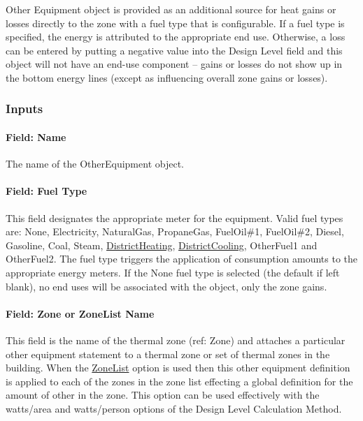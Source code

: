 Other Equipment object is provided as an additional source for heat gains or losses directly to the zone with a fuel type that is configurable. If a fuel type is specified, the energy is attributed to the appropriate end use. Otherwise, a loss can be entered by putting a negative value into the Design Level field and this object will not have an end-use component -- gains or losses do not show up in the bottom energy lines (except as influencing overall zone gains or losses).

\subsubsection{Inputs}\label{inputs-8-010}

\paragraph{Field: Name}\label{field-name-8-008}

The name of the OtherEquipment object.

\paragraph{Field: Fuel Type}\label{field-fuel-use-type}

This field designates the appropriate meter for the equipment. Valid fuel types are: None, Electricity, NaturalGas, PropaneGas, FuelOil\#1, FuelOil\#2, Diesel, Gasoline, Coal, Steam, \hyperref[districtheating]{DistrictHeating}, \hyperref[districtcooling]{DistrictCooling}, OtherFuel1 and OtherFuel2. The fuel type triggers the application of consumption amounts to the appropriate energy meters. If the None fuel type is selected (the default if left blank), no end uses will be associated with the object, only the zone gains.

\paragraph{Field: Zone or ZoneList Name}\label{field-zone-or-zonelist-name-6}

This field is the name of the thermal zone (ref: Zone) and attaches a particular other equipment statement to a thermal zone or set of thermal zones in the building. When the \hyperref[zonelist]{ZoneList} option is used then this other equipment definition is applied to each of the zones in the zone list effecting a global definition for the amount of other in the zone. This option can be used effectively with the watts/area and watts/person options of the Design Level Calculation Method.

